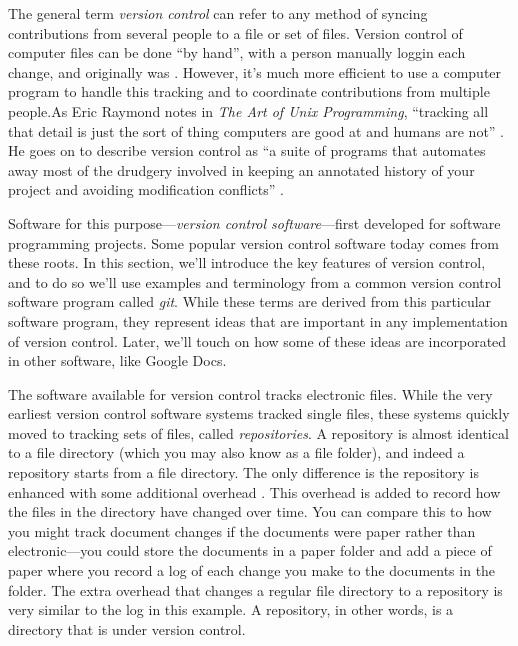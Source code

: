 \documentclass[]{tufte-book}
\begin{document}
The general term \emph{version control} can refer to any method of syncing
contributions from several people to a file or set of files. Version control of
computer files can be done ``by hand'', with a person manually loggin each change,
and originally was \citep{irving2011astonishments}. However, it's much more efficient
to use a computer program to handle this tracking and to coordinate
contributions from multiple people.As Eric Raymond notes in \emph{The Art of Unix
Programming}, ``tracking all that detail is just the sort of thing computers are
good at and humans are not'' \citep{raymond2003art}. He goes on to describe version
control as ``a suite of programs that automates away most of the drudgery
involved in keeping an annotated history of your project and avoiding
modification conflicts'' \citep{raymond2003art}.

Software for this purpose---\emph{version control software}---first developed for
software programming projects. Some popular version control software today
comes from these roots. In this section, we'll introduce the key features of
version control, and to do so we'll use examples and terminology from a common
version control software program called \emph{git}. While these terms are derived
from this particular software program, they represent ideas that are important
in any implementation of version control. Later, we'll touch on how some of these
ideas are incorporated in other software, like Google Docs.

The software available for version control tracks electronic files. While the
very earliest version control software systems tracked single files, these
systems quickly moved to tracking sets of files, called \emph{repositories}. A
repository is almost identical to a file directory (which you may also know as a
file folder), and indeed a repository starts from a file directory. The only
difference is the repository is enhanced with some additional overhead
\citep{klemens201421st}. This overhead is added to record how the files in the
directory have changed over time. You can compare this to how you might track
document changes if the documents were paper rather than electronic---you could
store the documents in a paper folder and add a piece of paper where you record
a log of each change you make to the documents in the folder. The extra overhead
that changes a regular file directory to a repository is very similar to the log
in this example. A repository, in other words, is a directory that is under
version control.
\end{document}
